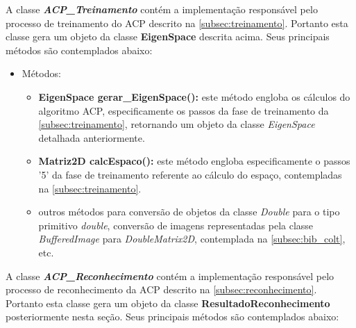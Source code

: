 
A classe \textit{\textbf{ACP\_Treinamento}} contém a implementação responsável pelo processo de treinamento do ACP descrito na \autoref{subsec:treinamento}. Portanto esta classe gera um objeto da classe \textbf{EigenSpace} descrita acima. Seus principais métodos são contemplados abaixo:


\begin{itemize}	
	\item Métodos:
	\begin{itemize}
		\item \textbf{EigenSpace gerar\_EigenSpace():} este método engloba os cálculos do algoritmo ACP, especificamente os passos da fase de treinamento da \autoref{subsec:treinamento}, retornando um objeto da classe \textit{EigenSpace} detalhada anteriormente. 
		
		\item \textbf{Matriz2D calcEspaco():} este método engloba especificamente o passos '5' da fase de treinamento referente ao cálculo do espaço, contempladas na \autoref{subsec:treinamento}.
		
		\item outros métodos para conversão de objetos da classe \textit{Double} para o tipo primitivo \textit{double}, conversão de imagens representadas pela classe \textit{BufferedImage} para \textit{DoubleMatrix2D}, contemplada na \autoref{subsec:bib_colt}, etc.
		
	\end{itemize}
\end{itemize}



A classe \textit{\textbf{ACP\_Reconhecimento}} contém a implementação responsável pelo processo de reconhecimento da ACP descrito na \autoref{subsec:reconhecimento}. Portanto esta classe gera um objeto da classe \textbf{ResultadoReconhecimento} posteriormente nesta seção. Seus principais métodos são contemplados abaixo:



